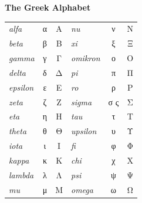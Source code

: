 \vspace*{\fill}
\begin{centering}
  \begin{table}[p]
    \addtolength{\tabcolsep}{1em}
    \addtolength{\extrarowheight}{1em}
    \centering
    \textbf{\LARGE The Greek Alphabet}\\[3em]
    \Large
    \begin{tabular}{l c c @{\hskip 2em}||@{\hskip 2em} l c c}
      \emph{alfa} & α & Α & \emph{nu} & ν & Ν \\
      \emph{beta} & β & Β & \emph{xi} & ξ & Ξ \\
      \emph{gamma} & γ & Γ & \emph{omikron} & ο & Ο \\
      \emph{delta} & δ & Δ & \emph{pi} & π & Π \\ 
      \emph{epsilon} & ε & Ε & \emph{ro} & ρ & Ρ \\
      \emph{zeta} & ζ & Ζ & \emph{sigma} & σ ς & Σ \\
      \emph{eta} & η & Η & \emph{tau} & τ & Τ \\ 
      \emph{theta} & θ & Θ & \emph{upsilon} & υ & Υ \\
      \emph{iota} & ι & Ι & \emph{fi} & φ & Φ \\
      \emph{kappa} & κ & Κ & \emph{chi} & χ & Χ \\
      \emph{lambda} & λ & Λ & \emph{psi} & ψ & Ψ \\
      \emph{mu} & μ & Μ & \emph{omega} & ω & Ω \\
    \end{tabular}
  \end{table}
\end{centering}
\vspace*{\fill}
